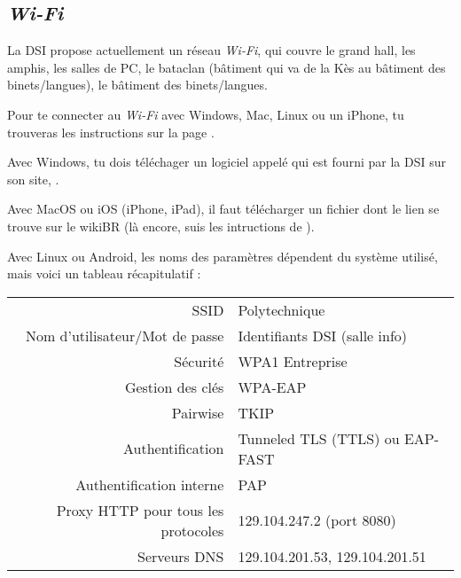 \subsection{\emph{Wi-Fi}}
La DSI propose actuellement un réseau \emph{Wi-Fi}, qui couvre le grand hall, les amphis, les salles de PC, le bataclan (bâtiment qui va de la Kès au bâtiment des
binets/langues), le bâtiment des binets/langues.

Pour te connecter au \emph{Wi-Fi} avec Windows, Mac, Linux ou un iPhone, tu trouveras les instructions sur la page .

Avec Windows, tu dois t\'el\'echager un logiciel appel\'e  qui est fourni par la DSI sur son site, .

Avec MacOS ou iOS (iPhone, iPad), il faut t\'el\'echarger un fichier  dont le lien se trouve sur le wikiBR (l\`a encore, suis les intructions de ).

Avec Linux ou Android, les noms des param\`etres d\'ependent du syst\`eme utilis\'e, mais voici un tableau r\'ecapitulatif :
\begin{center}
\begin{tabular}{r|l}
 SSID & Polytechnique \\
 Nom d'utilisateur/Mot de passe & Identifiants DSI (salle info) \\
 S\'ecurit\'e & WPA1 Entreprise \\
 Gestion des cl\'es & WPA-EAP \\
 Pairwise & TKIP \\
 Authentification & Tunneled TLS (TTLS) ou EAP-FAST \\
 Authentification interne & PAP \\
 Proxy HTTP pour tous les protocoles & 129.104.247.2 (port 8080) \\
 Serveurs DNS & 129.104.201.53, 129.104.201.51
\end{tabular}
\end{center}






